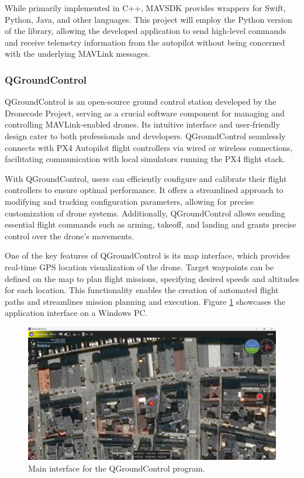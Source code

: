 While primarily implemented in C++, MAVSDK provides wrappers for Swift, Python, Java, and other languages. This project will employ the Python version of the library, allowing the developed application to send high-level commands and receive telemetry information from the autopilot without being concerned with the underlying MAVLink messages.


\subsubsection{QGroundControl}
\label{subsec:qgc}

QGroundControl \cite{qgroundcontrol-front} is an open-source ground control station developed by the Dronecode Project, serving as a crucial software component for managing and controlling MAVLink-enabled drones. Its intuitive interface and user-friendly design cater to both professionals and developers. QGroundControl seamlessly connects with PX4 Autopilot flight controllers via wired or wireless connections, facilitating communication with local simulators running the PX4 flight stack.

With QGroundControl, users can efficiently configure and calibrate their flight controllers to ensure optimal performance. It offers a streamlined approach to modifying and tracking configuration parameters, allowing for precise customization of drone systems. Additionally, QGroundControl allows sending essential flight commands such as arming, takeoff, and landing and grants precise control over the drone's movements.

One of the key features of QGroundControl is its map interface, which provides real-time GPS location visualization of the drone. Target waypoints can be defined on the map to plan flight missions, specifying desired speeds and altitudes for each location. This functionality enables the creation of automated flight paths and streamlines mission planning and execution. Figure \ref{fig:qgc-map} showcases the application interface on a Windows PC.

\begin{figure}
  \centering
  \includegraphics[width=\textwidth,keepaspectratio]{img/qgc-map.png}
  \caption{Main interface for the QGroundControl program.}
  \label{fig:qgc-map}
\end{figure}

